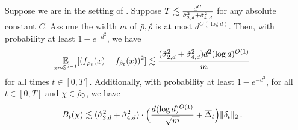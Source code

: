 \begin{lemma}\label{lemma:bt_bound_individual}
Suppose we are in the setting of . Suppose $T \lesssim \frac{d^C}{\hat{\sigma}_{2, d}^2 + \hat{\sigma}_{4, d}^2}$ for any absolute constant $C$. Assume the width $m$ of ${\bar{\rho}}, {\hat{\rho}}$ is at most $d^{O(\log d)}$. Then, with probability at least $1 - e^{-d^2}$, we have
\begin{align}
\operatorname*{\mathbb{E}}_{x \sim \mathbb{S}^{d - 1}} [(f_{\rho_t}(x) - f_{{\hat{\rho}}_t}(x))^2] 
& \lesssim \frac{(\hat{\sigma}_{2, d}^2 + \hat{\sigma}_{4, d}^2) d^2 (\log d)^{O(1)}}{m}
\end{align}
for all times $t \in [0, T]$. Additionally, with probability at least $1 - e^{-d^2}$, for all $t \in [0, T]$ and $\chi \in {\hat{\rho}}_0$, we have
\begin{align}
B_t(\chi) 
& \lesssim (\hat{\sigma}_{2, d}^2 + \hat{\sigma}_{4, d}^2) \cdot \Big(\frac{d (\log d)^{O(1)}}{\sqrt{m}} + \overline{\Delta}_t \Big) \|\delta_t\|_2 \,.
\end{align}
\end{lemma}
